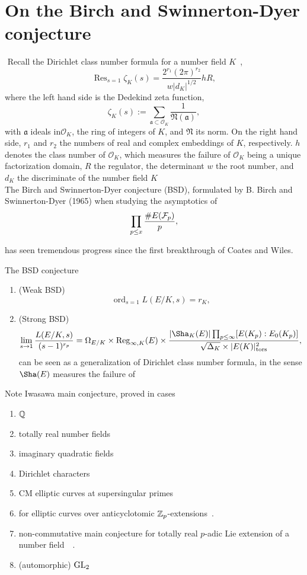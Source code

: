 \newpage
\section{On the Birch and Swinnerton-Dyer conjecture}
$ $
Recall the Dirichlet class number formula for a number field $K$~\cite{Neu1999},
\[
\operatorname{Res}_{s=1} \zeta_K (s)=\frac{2^{r_1}(2\pi)^{r_2}}{w|d_K|^{1/2}}hR,
\]
where the left hand side is the Dedekind zeta function,
\[
\zeta_K(s):=\sum_{\mathfrak{a}\subset \mathcal{O}_K}\frac{1}{\mathfrak{N}(\mathfrak{a})},  
\]
with $\mathfrak{a}$ {ideals in}\;$\mathcal{O}_K$, \textrm{the ring of integers of} $K$, and $\mathfrak{N}$ its norm.  On the right hand side, $r_1$ and $r_2$ the numbers of real and complex embeddings of $K$, respectively.  $h$ denotes the class number of $\mathcal{O}_K$, which measures the failure of $\mathcal{O}_K$ being a unique factorization domain, $R$ the regulator, the determinant $w$ the root number, and $d_K$ the discriminate of the number field $K$
{\ }\\

The Birch and Swinnerton-Dyer conjecture (BSD), formulated by B. Birch and Swinnerton-Dyer (1965) when studying the asymptotics of
\[
\prod_{p\le x}\frac{\# E(\mathcal{F}_p)}{p},
\] 

has seen tremendous progress since the first breakthrough of Coates and Wiles.


The BSD conjecture 
\begin{enumerate}[\bf (a)]
\item
(Weak BSD)
\[
\operatorname{ord}_{s=1} L(E/K, s)=r_K,
\]
\item
(Strong BSD)
\[
\lim_{s\to 1}\frac{L(E/K, s)}{(s-1)^{r_p}}=\Omega_{E/K}\times \operatorname{Reg}_{\infty, K}(E) \times \frac{|\Sha_K(E)| \prod_{p\le \infty}[E(K_p): E_0(K_p)]}{\sqrt{\Delta_K}\times |E(K)|_{\operatorname{tors}}^2},
\]
can be seen as a generalization of Dirichlet class number formula, in the sense
$\Sha(E)$ measures the failure of 
\end{enumerate}

Note Iwasawa main conjecture, proved in cases
\begin{enumerate}[1.]
\item
$\mathbb{Q}$~\cite{MW1984}
\item
totally real number fields~\cite{Wil1990}
\item
imaginary quadratic fields~\cite{Rub1988}~\cite{Rub1991}
\item
Dirichlet characters~\cite{HK2003}
\item
CM elliptic curves at supersingular primes~\cite{PR2004}
\item
for elliptic curves over anticyclotomic $\mathbb{Z}_p$-extensions~\cite{BD2005}.
\item
non-commutative main conjecture for totally real $p$-adic Lie extension of a number field~\cite{Kak2013}~\cite{CSSV2013}.
\item
(automorphic) ${\rm GL}_2$~\cite{SU2014}
\end{enumerate}


